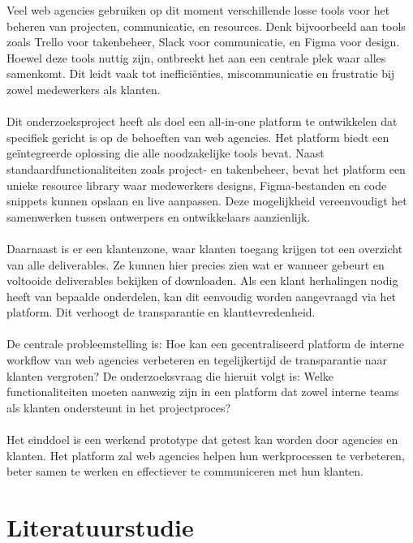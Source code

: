 Veel web agencies gebruiken op dit moment verschillende losse tools voor het beheren van projecten, communicatie, en resources. Denk bijvoorbeeld aan tools zoals Trello voor takenbeheer, Slack voor communicatie, en Figma voor design. Hoewel deze tools nuttig zijn, ontbreekt het aan een centrale plek waar alles samenkomt. Dit leidt vaak tot inefficiënties, miscommunicatie en frustratie bij zowel medewerkers als klanten.
\\
\\
Dit onderzoeksproject heeft als doel een all-in-one platform te ontwikkelen dat specifiek gericht is op de behoeften van web agencies. Het platform biedt een geïntegreerde oplossing die alle noodzakelijke tools bevat. Naast standaardfunctionaliteiten zoals project- en takenbeheer, bevat het platform een unieke resource library waar medewerkers designs, Figma-bestanden en code snippets kunnen opslaan en live aanpassen. Deze mogelijkheid vereenvoudigt het samenwerken tussen ontwerpers en ontwikkelaars aanzienlijk.
\\
\\
Daarnaast is er een klantenzone, waar klanten toegang krijgen tot een overzicht van alle deliverables. Ze kunnen hier precies zien wat er wanneer gebeurt en voltooide deliverables bekijken of downloaden. Als een klant herhalingen nodig heeft van bepaalde onderdelen, kan dit eenvoudig worden aangevraagd via het platform. Dit verhoogt de transparantie en klanttevredenheid.
\\
\\
De centrale probleemstelling is: Hoe kan een gecentraliseerd platform de interne workflow van web agencies verbeteren en tegelijkertijd de transparantie naar klanten vergroten? De onderzoeksvraag die hieruit volgt is: Welke functionaliteiten moeten aanwezig zijn in een platform dat zowel interne teams als klanten ondersteunt in het projectproces?
\\
\\
Het einddoel is een werkend prototype dat getest kan worden door agencies en klanten. Het platform zal web agencies helpen hun werkprocessen te verbeteren, beter samen te werken en effectiever te communiceren met hun klanten.

\section{Literatuurstudie}%
\label{sec:literatuurstudie}

